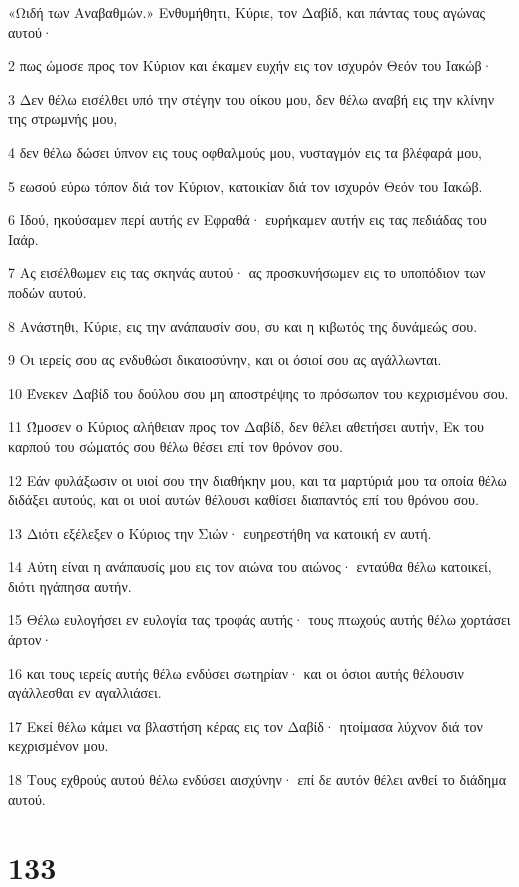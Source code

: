\par «Ωιδή των Αναβαθμών.» Ενθυμήθητι, Κύριε, τον Δαβίδ, και πάντας τους αγώνας αυτού·
\par 2 πως ώμοσε προς τον Κύριον και έκαμεν ευχήν εις τον ισχυρόν Θεόν του Ιακώβ·
\par 3 Δεν θέλω εισέλθει υπό την στέγην του οίκου μου, δεν θέλω αναβή εις την κλίνην της στρωμνής μου,
\par 4 δεν θέλω δώσει ύπνον εις τους οφθαλμούς μου, νυσταγμόν εις τα βλέφαρά μου,
\par 5 εωσού εύρω τόπον διά τον Κύριον, κατοικίαν διά τον ισχυρόν Θεόν του Ιακώβ.
\par 6 Ιδού, ηκούσαμεν περί αυτής εν Εφραθά· ευρήκαμεν αυτήν εις τας πεδιάδας του Ιαάρ.
\par 7 Ας εισέλθωμεν εις τας σκηνάς αυτού· ας προσκυνήσωμεν εις το υποπόδιον των ποδών αυτού.
\par 8 Ανάστηθι, Κύριε, εις την ανάπαυσίν σου, συ και η κιβωτός της δυνάμεώς σου.
\par 9 Οι ιερείς σου ας ενδυθώσι δικαιοσύνην, και οι όσιοί σου ας αγάλλωνται.
\par 10 Ένεκεν Δαβίδ του δούλου σου μη αποστρέψης το πρόσωπον του κεχρισμένου σου.
\par 11 Ώμοσεν ο Κύριος αλήθειαν προς τον Δαβίδ, δεν θέλει αθετήσει αυτήν, Εκ του καρπού του σώματός σου θέλω θέσει επί τον θρόνον σου.
\par 12 Εάν φυλάξωσιν οι υιοί σου την διαθήκην μου, και τα μαρτύριά μου τα οποία θέλω διδάξει αυτούς, και οι υιοί αυτών θέλουσι καθίσει διαπαντός επί του θρόνου σου.
\par 13 Διότι εξέλεξεν ο Κύριος την Σιών· ευηρεστήθη να κατοική εν αυτή.
\par 14 Αύτη είναι η ανάπαυσίς μου εις τον αιώνα του αιώνος· ενταύθα θέλω κατοικεί, διότι ηγάπησα αυτήν.
\par 15 Θέλω ευλογήσει εν ευλογία τας τροφάς αυτής· τους πτωχούς αυτής θέλω χορτάσει άρτον·
\par 16 και τους ιερείς αυτής θέλω ενδύσει σωτηρίαν· και οι όσιοι αυτής θέλουσιν αγάλλεσθαι εν αγαλλιάσει.
\par 17 Εκεί θέλω κάμει να βλαστήση κέρας εις τον Δαβίδ· ητοίμασα λύχνον διά τον κεχρισμένον μου.
\par 18 Τους εχθρούς αυτού θέλω ενδύσει αισχύνην· επί δε αυτόν θέλει ανθεί το διάδημα αυτού.

\chapter{133}

